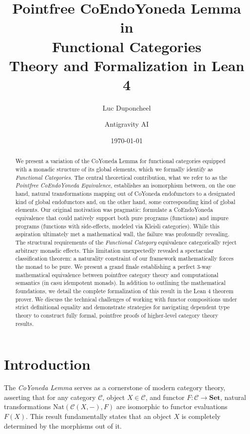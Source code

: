 \documentclass{article}
\title{Pointfree CoEndoYoneda Lemma \\ 
in \\
Functional Categories \\ 
Theory and Formalization in Lean 4}
\author{Luc Duponcheel \and Antigravity AI}
\date{\today}
\begin{document}
\maketitle

\begin{abstract}
We present a variation of the CoYoneda Lemma for functional categories equipped with a monadic
structure of its global elements, which we formally identify as \emph{Functional Categories}. 
\vspace{6 pt}
The central theoretical contribution, what we refer to as the
\emph{Pointfree CoEndoYoneda Equivalence}, establishes an isomorphism between, on the one hand,
natural transformations mapping out of Co\!Yoneda endofunctors to a designated kind of global
endofunctors and, on the other hand, some corresponding kind of global elements. 
\vspace{6 pt}
Our original motivation was pragmatic: formulate a CoEndoYoneda equivalence that could natively
support both pure programs (functions) and impure programs (functions with side-effects, modeled
via Kleisli categories). While this aspiration ultimately met a mathematical wall, the failure was
profoundly revealing. 
\vspace{6 pt}
The structural requirements of the \emph{Functional Category} equivalence categorically reject
arbitrary monadic effects. This limitation unexpectedly revealed a spectacular classification
theorem: a naturality constraint of our framework mathematically forces the monad to be pure. 
\vspace{6 pt}
We present a grand finale establishing a perfect 3-way mathematical equivalence between pointfree
category theory and computational semantics (in casu idempotent monads).
\vspace{6 pt}
In addition to outlining the mathematical foundations, we detail the complete formalization of this
result in the Lean 4 theorem prover. We discuss the technical challenges of working with functor
compositions under strict definitional equality and demonstrate strategies for navigating dependent
type theory to construct fully formal, pointfree proofs of higher-level category theory results.
\end{abstract}

\section{Introduction}

The \emph{Co\!Yoneda Lemma} serves as a cornerstone of modern category theory, asserting that for
any category $\mathcal{C}$, object $X \in \mathcal{C}$, and functor
$F : \mathcal{C} \to \mathbf{Set}$, natural transformations $\text{Nat}(\mathcal{C}(X, -), F)$ are
isomorphic to functor evaluations $F(X)$. This result fundamentally states that an object $X$ is
completely determined by the morphisms out of it.
\end{document}

